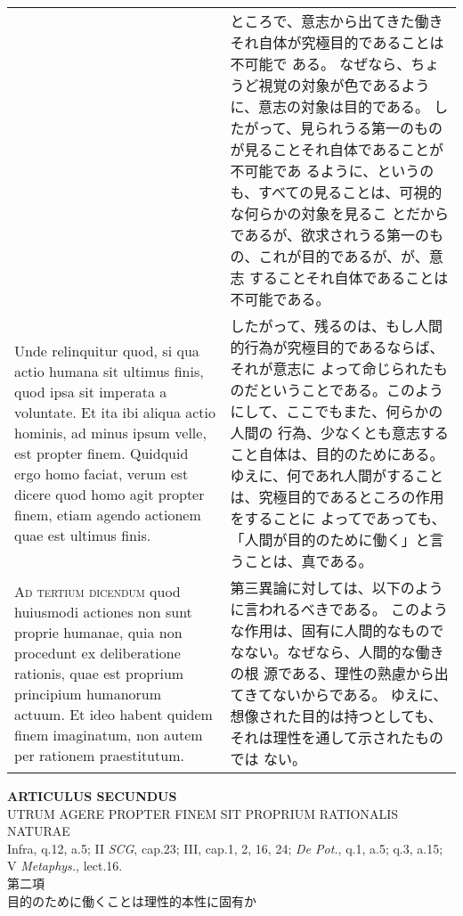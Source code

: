 \documentclass[10pt]{jsarticle} %
\begin{document}
\begin{longtable}{p{21em}p{21em}}
&

ところで、意志から出てきた働きそれ自体が究極目的であることは不可能で
 ある。
なぜなら、ちょうど視覚の対象が色であるように、意志の対象は目的である。
したがって、見られうる第一のものが見ることそれ自体であることが不可能であ
 るように、というのも、すべての見ることは、可視的な何らかの対象を見るこ
 とだからであるが、欲求されうる第一のもの、これが目的であるが、が、意志
 することそれ自体であることは不可能である。


\\

Unde relinquitur quod, si
qua actio humana sit ultimus finis, quod ipsa sit imperata a
voluntate. Et ita ibi aliqua actio hominis, ad minus ipsum velle, est
propter finem. Quidquid ergo homo faciat, verum est dicere quod homo
agit propter finem, etiam agendo actionem quae est ultimus finis.

&

したがって、残るのは、もし人間的行為が究極目的であるならば、それが意志に
 よって命じられたものだということである。このようにして、ここでもまた、何らかの人間の
 行為、少なくとも意志すること自体は、目的のためにある。
ゆえに、何であれ人間がすることは、究極目的であるところの作用をすることに
 よってであっても、「人間が目的のために働く」と言うことは、真である。


\\


{\scshape Ad tertium dicendum} quod huiusmodi
actiones non sunt proprie humanae, quia non procedunt ex deliberatione
rationis, quae est proprium principium humanorum actuum. Et ideo habent
quidem finem imaginatum, non autem per rationem praestitutum.

&

第三異論に対しては、以下のように言われるべきである。
このような作用は、固有に人間的なものでなない。なぜなら、人間的な働きの根
 源である、理性の熟慮から出てきてないからである。
ゆえに、想像された目的は持つとしても、それは理性を通して示されたものでは
 ない。







\end{longtable}
\newpage










\begin{center}
 {\Large {\bf ARTICULUS SECUNDUS}}\\
 {\large UTRUM AGERE PROPTER FINEM SIT PROPRIUM RATIONALIS NATURAE}\\
 {\footnotesize Infra, q.12, a.5; II {\itshape SCG}, cap.23; III, cap.1,
 2, 16, 24; {\itshape De Pot.}, q.1, a.5; q.3, a.15; V {\itshape
 Metaphys.}, lect.16.}\\
 {\Large 第二項\\目的のために働くことは理性的本性に固有か}
\end{center}
\end{document}
